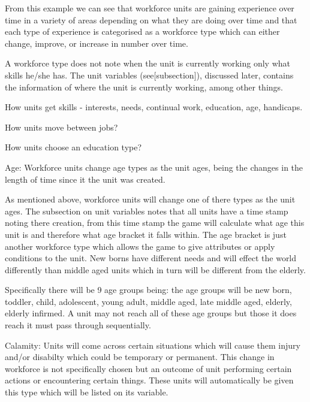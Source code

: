 From this example we can see that workforce units are gaining experience over time in a variety of areas depending on what they are doing over time and that each type of experience is categorised as a workforce type which can either change, improve, or increase in number over time. 

A workforce type does not note when the unit is currently working only what skills he/she has. The unit variables (see[subsection]), discussed later, contains the information of where the unit is currently working, among other things.

How units get skills - interests, needs, continual work, education, age, handicaps.

How units move between jobs?

How units choose an education type?


Age:
Workforce units change age types as the unit ages, being the changes in the length of time since it the unit was created. 

As mentioned above, workforce units will change one of there types as the unit ages. The subsection on unit variables notes that all units have a time stamp noting there creation, from this time stamp the game will calculate what age this unit is and therefore what age bracket it falls within. The age bracket is just another workforce type which allows the game to give attributes or apply conditions to the unit. New borns have different needs and will effect the world differently than middle aged units which in turn will be different from the elderly. 

Specifically there will be 9 age groups being: the age groups will be new born, toddler, child, adolescent, young adult, middle aged, late middle aged, elderly, elderly infirmed. A unit may not reach all of these age groups but those it does reach it must pass through sequentially.


Calamity:
Units will come across certain situations which will cause them injury and/or disabilty which could be temporary or permanent. This change in workforce is not specifically chosen but an outcome of unit performing certain actions or encountering certain things. These units will automatically be given this type which will be listed on its variable.  


